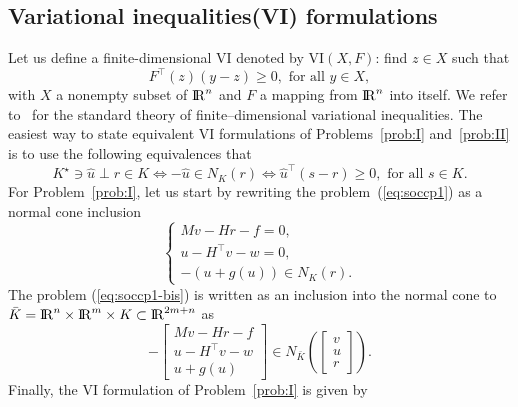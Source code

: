 \subsection{Variational inequalities(VI) formulations}

Let us define a finite-dimensional VI denoted by $\mathrm{VI}(X,F)$: find $z\in X$ such that 
\begin{equation}
  \label{eq:vi}
  F^\top(z)(y-z) \geq 0, \text{ for all } y \in X,
\end{equation}
with $X$ a nonempty subset of $\mathrm{I\!R}^n$ and $F$ a mapping from $\mathrm{I\!R}^n$ into itself. We refer to~\cite{Harker.Pang1990,Facchinei.Pang2003} for the standard  theory of finite--dimensional variational inequalities. The easiest way to state equivalent VI formulations of Problems~\ref{prob:I} and~\ref{prob:II} is to use the following equivalences that
\begin{equation}
  \label{eq:SOCCP-1}
  K^\star \ni {\hat u} \perp r \in K \Longleftrightarrow
  - {\hat u} \in N_K(r)  \Longleftrightarrow \hat u^\top (s -r) \geq 0, \text{ for all } s \in K.
\end{equation}
For Problem~\ref{prob:I}, let us start by rewriting the problem~(\ref{eq:soccp1}) as a normal cone inclusion
\begin{equation}
  \label{eq:soccp1-bis}
  \left\{\begin{array}{l}
    M v-H r-f=0, \\[2mm]
    u - H^\top v - w =0, \\[2mm]
   -(u + g(u)) \in N_K(r).
 \end{array}\right.
\end{equation}
The problem (\ref{eq:soccp1-bis}) is written as an inclusion into the normal cone to $\bar K = \mathrm{I\!R}^n \times \mathrm{I\!R}^m \times K\subset \mathrm{I\!R}^{2m+n}$ as
\begin{equation}
  \label{eq:soccp1-ter}
  - \left[\begin{array}{l}
    M v-H r-f \\
    u - H^\top v - w\\
   u + g(u)
 \end{array}\right]    \in N_{\bar K}\left(
\left[\begin{array}{l}
  v \\u \\r
\end{array}\right]
\right).
\end{equation}
Finally, the VI formulation of Problem~\ref{prob:I} is given by
